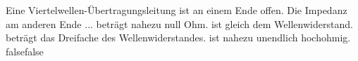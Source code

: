     {Eine Viertelwellen-Übertragungsleitung ist an einem Ende offen. Die Impedanz am anderen Ende ...}
    {beträgt nahezu null Ohm.}
    {ist gleich dem Wellenwiderstand.}
    {beträgt das Dreifache des Wellenwiderstandes.}
    {ist nahezu unendlich hochohmig.}
    {false}{false}